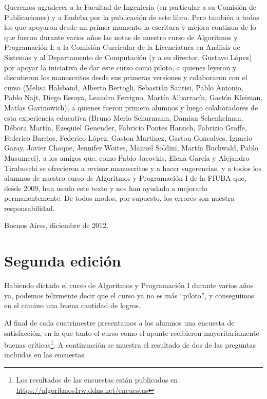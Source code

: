 Queremos agradecer a la Facultad de Ingeniería (en particular a su Comisión de Publicaciones) y a
Eudeba por la publicación de este libro. Pero también a todos los que apoyaron desde un primer momento
la escritura y mejora continua de lo que fueron durante varios años las notas de nuestro curso de
Algoritmos y Programación I: a la Comisión Curricular de la Licenciatura en Análisis de Sistemas y al
Departamento de Computación (y a su director, Gustavo López) por apoyar la iniciativa de dar este curso
como piloto, a quienes leyeron y discutieron los manuscritos desde sus primeras versiones y colaboraron
con el curso (Melisa Halsband, Alberto Bertogli, Sebastián Santisi, Pablo Antonio, Pablo Najt, Diego Essaya,
Leandro Ferrigno, Martín Albarracín, Gastón Kleiman, Matías Gavinowich), a quienes fueron primero alumnos y
luego colaboradores de esta experiencia educativa (Bruno Merlo Schurmann, Damian Schenkelman, Débora Martín,
Ezequiel Genender, Fabricio Pontes Harsich, Fabrizio Graffe, Federico Barrios, Federico López, Gaston
Martinez, Gaston Goncalves, Ignacio Garay, Javier Choque, Jennifer Woites, Manuel Soldini, Martín Buchwald,
Pablo Musumeci), a los amigos que, como Pablo Jacovkis, Elena García y Alejandro Tiraboschi se ofrecieron a
revisar manuscritos y a hacer sugerencias, y a todos los alumnos de nuestro curso de Algoritmos y
Programación I de la FIUBA que, desde 2009, han usado este texto y nos han ayudado a mejorarlo permanentemente.
De todos modos, por supuesto, los errores son nuestra responsabilidad.

\vspace{1cm}
\hfill Buenos Aires, diciembre de 2012.

\section*{Segunda edición}

Habiendo dictado el curso de Algoritmos y Programación I durante
varios años ya, podemos felizmente decir que el curso ya no es más ``piloto'',
y conseguimos en el camino una buena cantidad de logros.

Al final de cada cuatrimestre presentamos a los alumnos una encuesta de
satisfacción, en la que tanto el curso como el apunte recibieron
mayoritariamente buenas
críticas\footnote{Los resultados de las encuestas están publicados en
\url{https://algoritmos1rw.ddns.net/encuestas}}. A continuación se muestra el
resultado de dos de las preguntas incluidas en las encuestas.

